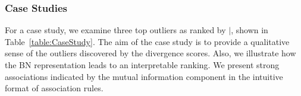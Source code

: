 \documentclass[conference]{IEEEtran}
\begin{document}
								
								
								
								
								
								
								\subsubsection{Case Studies} For a case study, we examine three top outliers as ranked by $\mid$, shown in Table~\ref{table:CaseStudy}. 
								The aim of the case study is to provide a qualitative sense of the outliers discovered by the divergence scores. Also, we illustrate how the BN representation leads to an interpretable ranking. 
								We present strong associations indicated by the mutual information component in the intuitive format of association rules.
								
\end{document}
